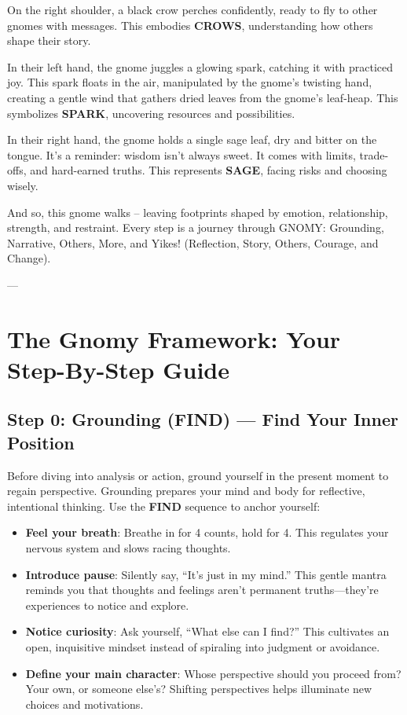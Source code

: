 \documentclass{article}
\begin{document}
On the right shoulder, a black crow perches confidently, ready to fly to other gnomes with messages. This embodies \textbf{CROWS}, understanding how others shape their story.

In their left hand, the gnome juggles a glowing spark, catching it with practiced joy. This spark floats in the air, manipulated by the gnome's twisting hand, creating a gentle wind that gathers dried leaves from the gnome's leaf-heap. This symbolizes \textbf{SPARK}, uncovering resources and possibilities.

In their right hand, the gnome holds a single sage leaf, dry and bitter on the tongue. It's a reminder: wisdom isn't always sweet. It comes with limits, trade-offs, and hard-earned truths. This represents \textbf{SAGE}, facing risks and choosing wisely.

And so, this gnome walks -- leaving footprints shaped by emotion, relationship, strength, and restraint. Every step is a journey through GNOMY: Grounding, Narrative, Others, More, and Yikes! (Reflection, Story, Others, Courage, and Change).

---

\section{The Gnomy Framework: Your Step-By-Step Guide}

\subsection{Step 0: Grounding (FIND) — Find Your Inner Position}
Before diving into analysis or action, ground yourself in the present moment to regain perspective. Grounding prepares your mind and body for reflective, intentional thinking. Use the \textbf{FIND} sequence to anchor yourself:
\begin{itemize}[noitemsep,topsep=0pt]
    \item \textbf{Feel your breath}: Breathe in for 4 counts, hold for 4. This regulates your nervous system and slows racing thoughts.
    \item \textbf{Introduce pause}: Silently say, ``It's just in my mind.'' This gentle mantra reminds you that thoughts and feelings aren't permanent truths—they're experiences to notice and explore.
    \item \textbf{Notice curiosity}: Ask yourself, ``What else can I find?'' This cultivates an open, inquisitive mindset instead of spiraling into judgment or avoidance.
    \item \textbf{Define your main character}: Whose perspective should you proceed from? Your own, or someone else's? Shifting perspectives helps illuminate new choices and motivations.
\end{itemize}
\end{document}
